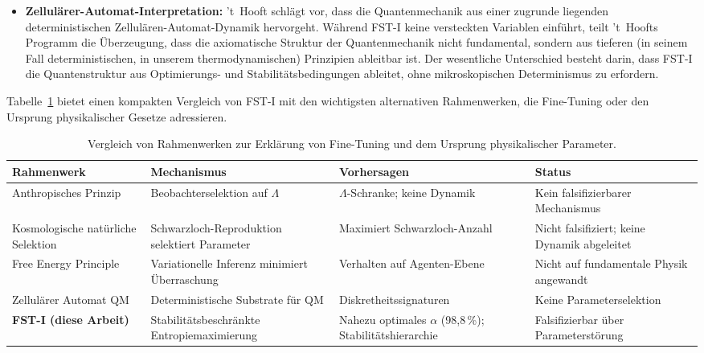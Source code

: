 \documentclass[12pt,a4paper]{article}
\theoremstyle{remark}
\begin{document}
\begin{itemize}
    \item \textbf{Zellul\"arer-Automat-Interpretation:} 't~Hooft \citep{tHooft2016} schl\"agt vor, dass die Quantenmechanik aus einer zugrunde liegenden deterministischen Zellul\"aren-Automat-Dynamik hervorgeht. W\"ahrend FST-I keine versteckten Variablen einf\"uhrt, teilt 't~Hoofts Programm die \"Uberzeugung, dass die axiomatische Struktur der Quantenmechanik nicht fundamental, sondern aus tieferen (in seinem Fall deterministischen, in unserem thermodynamischen) Prinzipien ableitbar ist. Der wesentliche Unterschied besteht darin, dass FST-I die Quantenstruktur aus Optimierungs- und Stabilit\"atsbedingungen ableitet, ohne mikroskopischen Determinismus zu erfordern.
\end{itemize}

Tabelle~\ref{tab:framework-comparison} bietet einen kompakten Vergleich von FST-I mit den wichtigsten alternativen Rahmenwerken, die Fine-Tuning oder den Ursprung physikalischer Gesetze adressieren.

\begin{table}[ht]
\centering
\small
\caption{Vergleich von Rahmenwerken zur Erkl\"arung von Fine-Tuning und dem Ursprung physikalischer Parameter.}
\label{tab:framework-comparison}
\begin{tabular}{@{}p{3.2cm}p{3.8cm}p{3.5cm}p{3.5cm}@{}}
\toprule
\textbf{Rahmenwerk} & \textbf{Mechanismus} & \textbf{Vorhersagen} & \textbf{Status} \\
\midrule
Anthropisches Prinzip \citep{Weinberg1987} & Beobachterselektion auf $\Lambda$ & $\Lambda$-Schranke; keine Dynamik & Kein falsifizierbarer Mechanismus \\[4pt]
Kosmologische nat\"urliche Selektion \citep{Smolin1992} & Schwarzloch-Reproduktion selektiert Parameter & Maximiert Schwarzloch-Anzahl & Nicht falsifiziert; keine Dynamik abgeleitet \\[4pt]
Free Energy Principle \citep{Friston2010} & Variationelle Inferenz minimiert \"Uberraschung & Verhalten auf Agenten-Ebene & Nicht auf fundamentale Physik angewandt \\[4pt]
Zellul\"arer Automat QM \citep{tHooft2016} & Deterministische Substrate f\"ur QM & Diskretheitssignaturen & Keine Parameterselektion \\[4pt]
\textbf{FST-I (diese Arbeit)} & Stabilit\"atsbeschr\"ankte Entropiemaximierung & Nahezu optimales $\alpha$ (98,8\,\%); Stabilit\"atshierarchie & Falsifizierbar \"uber Parameterst\"orung \\
\bottomrule
\end{tabular}
\end{table}
\end{document}

